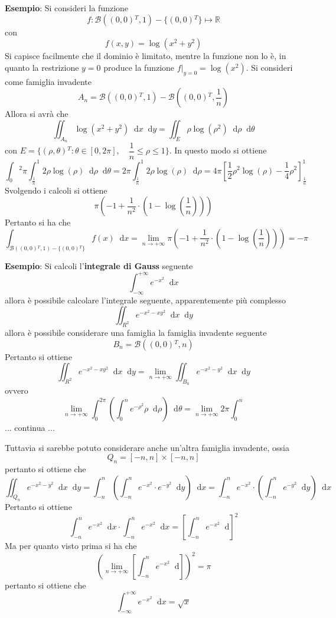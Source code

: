 \documentclass[a4paper]{extarticle}
\newcommand*\dif{\mathop{}\!\mathrm{d}}
\begin{document}
\vspace{2em}
\noindent
\textbf{Esempio}: Si consideri la funzione
\[f : \mathcal{B}((0,0){^T}, 1) - \{(0,0){^T}\} \longmapsto \mathbb{R}\]
con
\[f(x,y) = \log(x^2+y^2)\]
Si capisce facilmente che il dominio è limitato, mentre la funzione non lo è, in quanto la restrizione $y=0$ produce la funzione $f\vert_{y=0} = \log(x^2)$. Si consideri come famiglia invadente
\[A_n = \mathcal{B}((0,0){^T},1) - \mathcal{B} \left((0,0){^T},\dfrac{1}{n}\right)\]
Allora si avrà che
\[\iint_{A_n} \log(x^2+y^2) \dif x \dif y = \iint_E \rho \log(\rho^2) \dif \rho \dif \theta\]
con $E = \{(\rho,\theta){^T} : \theta \in [0,2\pi], \hspace{1em} \dfrac{1}{n} \leq \rho \leq 1\}$. In questo modo si ottiene 
\[\int_0{^2\pi} \int_{\frac{1}{n}}^{1} 2 \rho \log(\rho) \dif \rho \dif \theta = 2 \pi \int_{\frac{1}{n}}^1 2 \rho \log(\rho) \dif \rho = 4 \pi \left[\frac{1}{2} \rho^2 \log(\rho) - \frac{1}{4} \rho^2\right]_{\frac{1}{n}}^1\]
Svolgendo i calcoli si ottiene
\[\pi \left(- 1 + \dfrac{1}{n^2} \cdot \left(1-\log \left(\dfrac{1}{n}\right)\right)\right)\]
Pertanto si ha che
\[\int_{\mathcal{B}((0,0){^T}, 1) - \{(0,0){^T}\}} f(x) \dif x= \lim_{n \to +\infty} \pi \left(- 1 + \dfrac{1}{n^2} \cdot \left(1-\log \left(\dfrac{1}{n}\right)\right)\right) = -\pi\]

\vspace{2em}
\noindent
\textbf{Esempio}: Si calcoli l'\textbf{integrale di Gauss} seguente
\[\int_{-\infty}^{+\infty} e^{-x^2} \dif x\]
allora è possibile calcolare l'integrale seguente, apparentemente più complesso
\[\iint_{R^2} e^{-x^2-xy^2} \dif x \dif y\]
allora è possibile considerare una famiglia la famiglia invadente seguente
\[B_n = \mathcal{B}((0,0){^T},n)\]
Pertanto si ottiene
\[\iint_{R^2} e^{-x^2-xy^2} \dif x \dif y = \lim_{n \to +\infty} \iint_{B_n} e^{-x^2-y^2} \dif x \dif y\]
ovvero
\[\lim_{n \to +\infty} \int_0^{2 \pi} \left(\int_0^n e^{-\rho^2} \rho \dif \rho\right) \dif \theta = \lim_{n \to +\infty} 2\pi \int_0^n \]
... continua ...

\vspace{1em}
\noindent
Tuttavia si sarebbe potuto considerare anche un'altra famiglia invadente, ossia
\[Q_n = [-n, n] \times [-n, n]\]
pertanto si ottiene che
\[\iint_{Q_n} e^{-x^2-y^2} \dif x \dif y = \int_{-n}^n \left(\int_{-n}^n e^{-x^2} \cdot e^{-y^2} \dif y\right) \dif x = \int_{-n}^n e^{-x^2} \cdot \left(\int_{-n}^n e^{-y^2} \dif y\right) \dif x\]
Pertanto si ottiene
\[\int_{-n}^n e^{-x^2} \dif x\cdot \int_{-n}^n e^{-x^2} \dif x = \left[\int_{-n}^n e^{-x^2}\dif \right]^2\]
Ma per quanto visto prima si ha che
\[\left(\lim_{n \to +\infty} \left[\int_{-n}^n e^{-x^2}\dif \right]\right)^2 = \pi\]
pertanto si ottiene che
\[\int_{-\infty}^{+\infty} e^{-x^2} \dif x = \sqrt{x}\]
\end{document}
